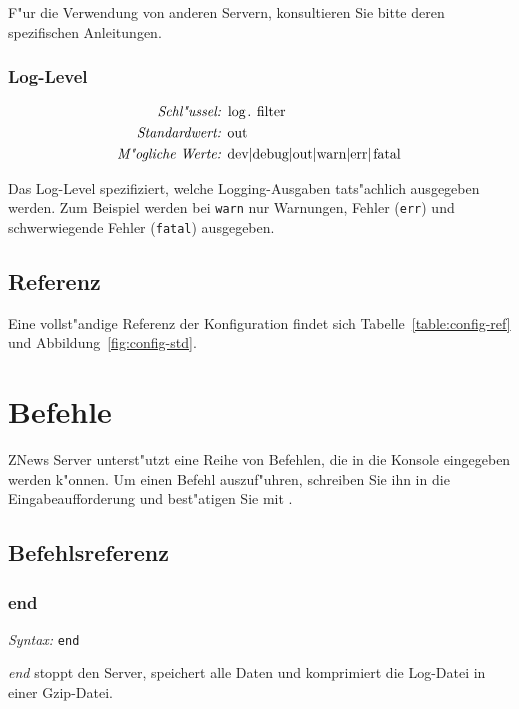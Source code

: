 F"ur die Verwendung von anderen Servern, konsultieren Sie
bitte deren spezifischen Anleitungen.

\subsubsection{Log-Level}

\begin{align*}
    \emph{Schl"ussel: } & \lstinline{log.filter}\\
    \emph{Standardwert: } & \lstinline{out}\\
    \emph{M"ogliche Werte: } & \lstinline{dev|debug|out|warn|err|fatal}
\end{align*}

Das Log-Level spezifiziert, welche Logging-Ausgaben tats"achlich
ausgegeben werden. Zum Beispiel werden bei \lstinline{warn}
nur Warnungen, Fehler (\lstinline{err}) und schwerwiegende Fehler
(\lstinline{fatal}) ausgegeben.

\subsection{Referenz}

Eine vollst"andige Referenz der Konfiguration
findet sich Tabelle~\ref{table:config-ref}
und Abbildung~\ref{fig:config-std}.

\section{Befehle}

ZNews Server unterst"utzt eine Reihe von Befehlen,
die in die Konsole eingegeben werden k"onnen.
Um einen Befehl auszuf"uhren, schreiben Sie ihn
in die Eingabeaufforderung und best"atigen Sie
mit .

\subsection{Befehlsreferenz}

\subsubsection{end}

\hspace*{2cm}\emph{Syntax: } \lstinline{end}
\vspace*{0.2cm}

\emph{end} stoppt den Server, speichert alle Daten
und komprimiert die Log-Datei in einer Gzip-Datei.

